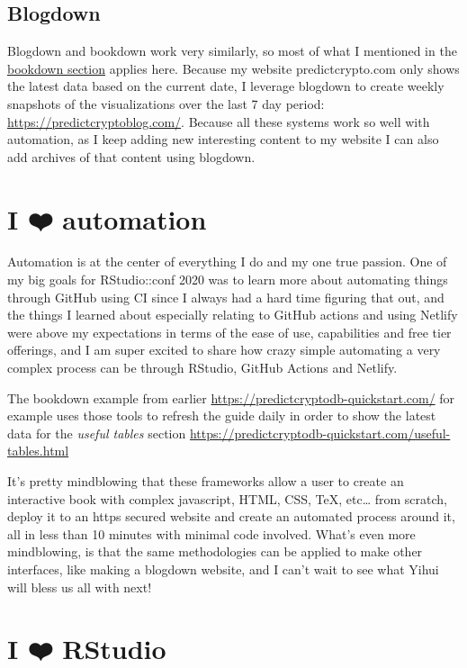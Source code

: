 \documentclass[
]{book}
\begin{document}
\hypertarget{blogdown}{%
\subsection{Blogdown}\label{blogdown}}

Blogdown\citep{R-blogdown} and bookdown work very similarly, so most of what I mentioned in the \protect\hyperlink{bookdown}{bookdown section} applies here. Because my website predictcrypto.com only shows the latest data based on the current date, I leverage blogdown to create weekly snapshots of the visualizations over the last 7 day period: \url{https://predictcryptoblog.com/}. Because all these systems work so well with automation, as I keep adding new interesting content to my website I can also add archives of that content using blogdown.

\hypertarget{automation}{%
\section{I ❤️ automation}\label{automation}}

Automation is at the center of everything I do and my one true passion. One of my big goals for RStudio::conf 2020 was to learn more about automating things through GitHub using CI since I always had a hard time figuring that out, and the things I learned about especially relating to GitHub actions and using Netlify were above my expectations in terms of the ease of use, capabilities and free tier offerings, and I am super excited to share how crazy simple automating a very complex process can be through RStudio, GitHub Actions and Netlify.

The bookdown example from earlier \url{https://predictcryptodb-quickstart.com/} for example uses those tools to refresh the guide daily in order to show the latest data for the \emph{useful tables} section \url{https://predictcryptodb-quickstart.com/useful-tables.html}

It's pretty mindblowing that these frameworks allow a user to create an interactive book with complex javascript, HTML, CSS, TeX, etc\ldots{} from scratch, deploy it to an https secured website and create an automated process around it, all in less than 10 minutes with minimal code involved. What's even more mindblowing, is that the same methodologies can be applied to make other interfaces, like making a blogdown website, and I can't wait to see what Yihui will bless us all with next!

\hypertarget{rstudio}{%
\section{I ❤️ RStudio}\label{rstudio}}
\end{document}
